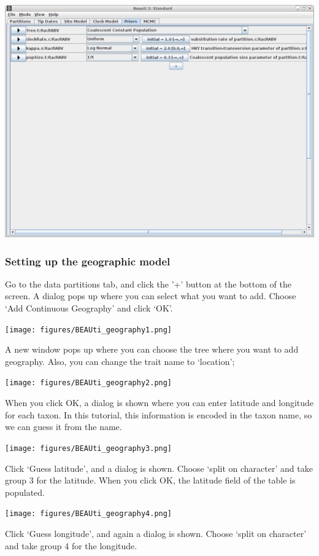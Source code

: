 \documentclass{article}
\begin{document}
\includegraphics[scale=0.4,clip=true,trim=0 400 0 0]{figures/BEAUti_priors.png}


\subsubsection*{Setting up the geographic model}

Go to the data partitions tab, and click the '+' button at the bottom of the screen.
A dialog pops up where you can select what you want to add. Choose `Add Continuous Geography'
and click `OK'.

\texttt{[image: figures/BEAUti\_geography1.png]}

A new window pops up where you can choose the tree where you want to add geography.
Also, you can change the trait name to `location';

\texttt{[image: figures/BEAUti\_geography2.png]}

When you click OK, a dialog is shown where you can enter latitude and longitude for each taxon.
In this tutorial, this information is encoded in the taxon name, so we can guess it from the name. 

\texttt{[image: figures/BEAUti\_geography3.png]}

Click `Guess latitude', and a dialog is shown. Choose `split on character' and take group 3 for the latitude.
When you click OK, the latitude field of the table is populated.

\texttt{[image: figures/BEAUti\_geography4.png]}

Click `Guess longitude', and again a dialog is shown. Choose `split on character' and take group 4 for the longitude.
\end{document}
